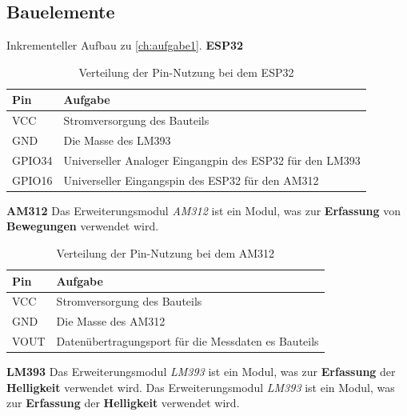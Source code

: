 \documentclass[9pt,a4paper]{report}
\begin{document}
	\subsection{Bauelemente}
	Inkrementeller Aufbau zu \cref{ch:aufgabe1}.
	\newline
	\newline
	\textbf{ESP32}
	\renewcommand{\arraystretch}{1.5}
	\begin{table}[h!]
		\centering
		\caption{Verteilung der Pin-Nutzung bei dem ESP32}
		\label{tab:teil_2_steckbrett_esp32}
		\begin{tabular}{|l|l|} 
			\hline
			Pin & Aufgabe \\
			\hline
			VCC & Stromversorgung des Bauteils \\
			GND & Die Masse des LM393 \\
			GPIO34 & Universeller Analoger Eingangpin des ESP32 für den LM393 \\
			GPIO16 & Universeller Eingangspin des ESP32 für den AM312 \\
			\hline
		\end{tabular}
	\end{table}
	\renewcommand{\arraystretch}{1}
	\newline
	\newline
	\textbf{AM312}
	\newline
	Das Erweiterungsmodul \textit{AM312} ist ein Modul, was zur \textbf{Erfassung} von \textbf{Bewegungen} verwendet wird.
	\renewcommand{\arraystretch}{1.5}
	\begin{table}[h!]
		\centering
		\caption{Verteilung der Pin-Nutzung bei dem AM312}
		\label{tab:teil_2_steckbrett_am312}
		\begin{tabular}{|l|l|}
			\hline
			Pin & Aufgabe \\
			\hline
			VCC & Stromversorgung des Bauteils \\
			GND & Die Masse des AM312 \\
			VOUT & Datenübertragungsport für die Messdaten es Bauteils \\
			\hline
		\end{tabular}
	\end{table}
	\renewcommand{\arraystretch}{1}
	\newline
	\newline
	\textbf{LM393}
	\newline
	Das Erweiterungsmodul \textit{LM393} ist ein Modul, was zur \textbf{Erfassung} der \textbf{Helligkeit} verwendet wird.
	Das Erweiterungsmodul \textit{LM393} ist ein Modul, was zur \textbf{Erfassung} der \textbf{Helligkeit} verwendet wird.
\end{document}
